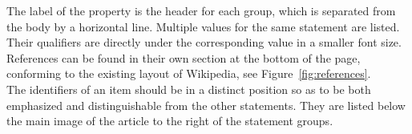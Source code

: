 	The label of the property is the header for each group, which is separated from the body by a horizontal line. Multiple values for the same statement are listed. Their qualifiers are directly under the corresponding value in a smaller font size. \\
	References can be found in their own section at the bottom of the page, conforming to the existing layout of Wikipedia, see Figure~\ref{fig:references}. \\
	The identifiers of an item should be in a distinct position so as to be both emphasized and distinguishable from the other statements. They are listed below the main image of the article to the right of the statement groups.
	
	
	
	
	